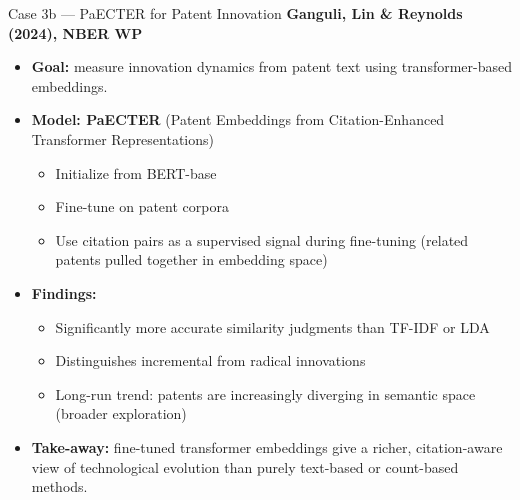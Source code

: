 \begin{frame}{Case 3b --- PaECTER for Patent Innovation}
\textbf{Ganguli, Lin \& Reynolds (2024), NBER WP}

\medskip
\begin{itemize}
\item \textbf{Goal:} measure innovation dynamics from patent text using transformer-based embeddings.

\medskip
\item \textbf{Model: PaECTER} (Patent Embeddings from Citation-Enhanced Transformer Representations)
\begin{itemize}
    \item Initialize from BERT-base
    \item Fine-tune on patent corpora
    \item Use citation pairs as a supervised signal during fine-tuning (related patents pulled together in embedding space)
\end{itemize}

\medskip
\item \textbf{Findings:}
\begin{itemize}
    \item Significantly more accurate similarity judgments than TF-IDF or LDA
    \item Distinguishes incremental from radical innovations
    \item Long-run trend: patents are increasingly diverging in semantic space (broader exploration)
\end{itemize}

\medskip
\item \textbf{Take-away:} fine-tuned transformer embeddings give a richer, citation-aware view of technological evolution than purely text-based or count-based methods.
\end{itemize}
\end{frame}

